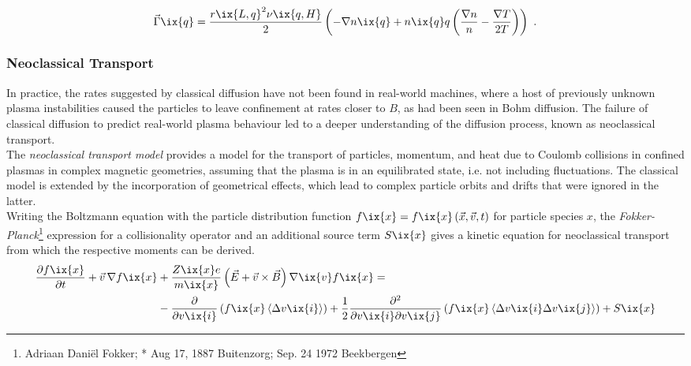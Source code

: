                 \begin{align}%
                    \vec{\Gamma}\ix{q}=\frac{r\ix{L,q}^{2}\nu\ix{q,H}}{2}\left(-\nabla n\ix{q}+n\ix{q}q\left(\frac{\nabla n}{n}-\frac{\nabla T}{2T}\right)\right)\,\,.\nonumber%
                \end{align}%
%
            \subsubsection*{Neoclassical Transport}%
%
                In practice, the rates suggested by classical diffusion have not been found in real-world machines, where a host of previously unknown plasma instabilities caused the particles to leave confinement at rates closer to $B$, as had been seen in Bohm diffusion. The failure of classical diffusion to predict real-world plasma behaviour led to a deeper understanding of the diffusion process, known as neoclassical transport.\\%
                The \textit{neoclassical transport model} provides a model for the transport of particles, momentum, and heat due to Coulomb collisions in confined plasmas in complex magnetic geometries, assuming that the plasma is in an equilibrated state, i.e. not including fluctuations. The classical model is extended by the incorporation of geometrical effects, which lead to complex particle orbits and drifts that were ignored in the latter.\\
                Writing the Boltzmann equation with the particle distribution function $f\ix{x}=f\ix{x}\left(\vec{x},\vec{v},t\right)$ for particle species $x$, the \textit{Fokker-Planck}\footnote[1]{Adriaan Daniël Fokker; * Aug 17, 1887 Buitenzorg; \textdagger Sep. 24 1972 Beekbergen} expression for a collisionality operator and an additional source term $S\ix{x}$ gives a kinetic equation for neoclassical transport from which the respective moments can be derived\cite{WikiFokkerPlanck}.%
%
                \begin{align}%
                    \frac{\partial f\ix{x}}{\partial t}+\vec{v}\,\nabla f\ix{x}&+\frac{Z\ix{x}e}{m\ix{x}}\left(\vec{E}+\vec{v}\times\vec{B}\right)\nabla\ix{v}f\ix{x}=\nonumber\\%
                    &-\frac{\partial}{\partial v\ix{i}}\left(f\ix{x}\left\langle\Delta v\ix{i}\right\rangle\right)+\frac{1}{2}\frac{\partial^{2}}{\partial v\ix{i}\partial v\ix{j}}\left(f\ix{x}\left\langle\Delta v\ix{i}\Delta v\ix{j}\right\rangle\right)+S\ix{x}\label{eq:neoclassical}%
                \end{align}%

